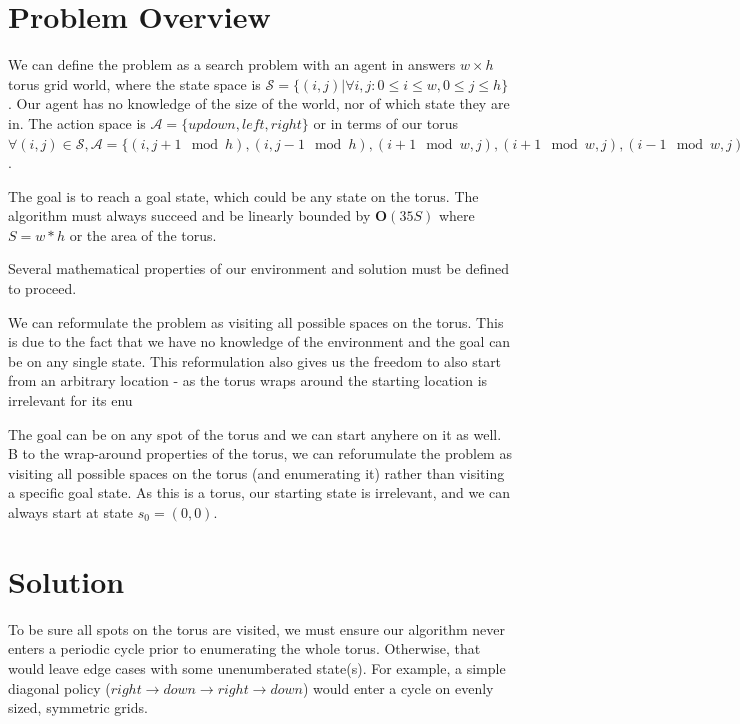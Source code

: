 \documentclass{article}
\begin{document}
\section{Problem Overview}
We can define the problem as a search problem with an agent in answers $w
    \times h$ torus grid world, where the state space is $\mathcal{S}=\{(i, j) |
    \forall i, j: 0 \le i \le w, 0 \le j \le h\}$. Our agent has no knowledge of
the size of the world, nor of which state they are in. The action space is
$\mathcal A = \{up down, left, right\}$ or in terms of our torus $\forall (i,
    j) \in \mathcal S, \mathcal A = \{(i, j + 1 \mod h), (i, j - 1 \mod h), ( i + 1
    \mod w, j), (i + 1 \mod w, j), (i - 1\mod w, j) \}$.

The goal is to reach a goal state, which could be any state on the torus. The
algorithm must always succeed and be linearly bounded by $\mathbf O(35 S)$
where $S = w * h$ or the area of the torus.

Several mathematical properties of our environment and solution must be defined
to proceed. 

We can reformulate the problem as visiting all possible spaces on the torus. This is due to the fact that we have no knowledge of the environment
and the goal can be on any single state. This reformulation also gives us the freedom to also start from an arbitrary location - as the torus wraps around
the starting location is irrelevant for its enu

The goal can be on any spot of the torus and we can start anyhere
on it as well. B to the wrap-around properties of the torus, we can
reforumulate the problem as visiting all possible spaces on the torus (and
enumerating it) rather than visiting a specific goal state. As this is a torus,
our starting state is irrelevant, and we can always start at state $s_0 = (0, 0)$.

\section{Solution}
To be sure all spots on the torus are visited, we must ensure our algorithm never enters a periodic cycle prior to enumerating 
the whole torus. Otherwise, that would leave edge cases with some unenumberated state(s). For example, a simple diagonal policy ($right \to down \to right \to down$) would 
enter a cycle on evenly sized, symmetric grids.
\end{document}
